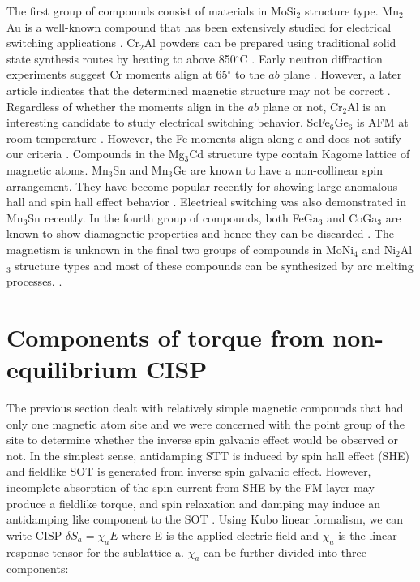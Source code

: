 \documentclass[letterpaper,10pt,doublespacing,edeposit]{uiucthesis2020}
\begin{document}
\begin{mainmatter}

The first group of compounds consist of materials in MoSi$_2$ structure type. Mn$_2$Au is a well-known compound that has been extensively studied for electrical switching applications \cite{Meinert2018,Bodnar2019}. Cr$_2$Al powders can be prepared using traditional solid state synthesis routes by heating to above 850$^\circ$C \cite{Susner2015}. Early neutron diffraction experiments suggest Cr moments align at 65$^\circ$ to the $ab$ plane \cite{Atoji1965}. However, a later article indicates that the determined magnetic structure may not be correct \cite{Kallel1967}. Regardless of whether the moments align in the $ab$ plane or not, Cr$_2$Al is an interesting candidate to study electrical switching behavior. ScFe$_6$Ge$_6$ is AFM at room temperature \cite{Venturini1992}. However, the Fe moments align along $c$ and does not satify our criteria \cite{Mazet2000}. Compounds in the Mg$_3$Cd structure type contain Kagome lattice of magnetic atoms. Mn$_3$Sn and Mn$_3$Ge are known to have a non-collinear spin arrangement. They have become popular recently for showing large anomalous hall and spin hall effect behavior \cite{Nakatsuji2015,Kubler2014,Kimata2019}. Electrical switching was also demonstrated in Mn$_3$Sn recently. In the fourth group of compounds, both FeGa$_3$ and CoGa$_3$ are known to show diamagnetic properties and hence they can be discarded \cite{Haussermann2002,Viklund2002,Zhang2017}. The magnetism is unknown in the final two groups of compounds in MoNi$_4$ and Ni$_2$Al$_3$ structure types and most of these compounds can be synthesized by arc melting processes. \cite{Harker1944,Taylor1972}.

\section{Components of torque from non-equilibrium CISP}


The previous section dealt with relatively simple magnetic compounds that had only one magnetic atom site and we were concerned with the point group of the site to determine whether the inverse spin galvanic effect would be observed or not. In the simplest sense, antidamping STT is induced by spin hall effect (SHE) and fieldlike SOT is generated from inverse spin galvanic effect. However, incomplete absorption of the spin current from SHE by the FM layer may produce a fieldlike torque, and spin relaxation and damping may induce an antidamping like component to the SOT \cite{Zelezny2017}. Using Kubo linear formalism, we can write CISP $\delta S_a = \chi_a E$ where E is the applied electric field and $\chi_a$ is the linear response tensor for the sublattice a. $\chi_a$ can be further divided into three components:


\end{mainmatter}
\end{document}
